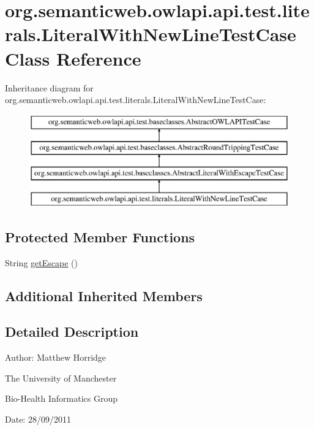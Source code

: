 \hypertarget{classorg_1_1semanticweb_1_1owlapi_1_1api_1_1test_1_1literals_1_1_literal_with_new_line_test_case}{\section{org.\-semanticweb.\-owlapi.\-api.\-test.\-literals.\-Literal\-With\-New\-Line\-Test\-Case Class Reference}
\label{classorg_1_1semanticweb_1_1owlapi_1_1api_1_1test_1_1literals_1_1_literal_with_new_line_test_case}
}
Inheritance diagram for org.\-semanticweb.\-owlapi.\-api.\-test.\-literals.\-Literal\-With\-New\-Line\-Test\-Case\-:\begin{figure}[H]
\begin{center}
\leavevmode
\includegraphics[height=4.000000cm]{classorg_1_1semanticweb_1_1owlapi_1_1api_1_1test_1_1literals_1_1_literal_with_new_line_test_case}
\end{center}
\end{figure}
\subsection*{Protected Member Functions}
\begin{DoxyCompactItemize}
\item 
String \hyperlink{classorg_1_1semanticweb_1_1owlapi_1_1api_1_1test_1_1literals_1_1_literal_with_new_line_test_case_ae898e6b355585c542d454f783b6066c7}{get\-Escape} ()
\end{DoxyCompactItemize}
\subsection*{Additional Inherited Members}


\subsection{Detailed Description}
Author\-: Matthew Horridge\par
 The University of Manchester\par
 Bio-\/\-Health Informatics Group\par
 Date\-: 28/09/2011 

